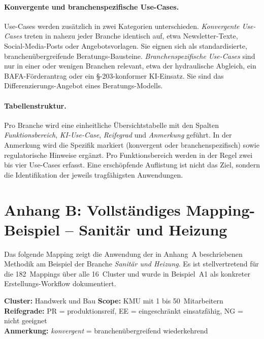 \documentclass[a4paper,11pt]{article}
\begin{document}
\paragraph{Konvergente und branchenspezifische Use-Cases.}
Use-Cases werden zusätzlich in zwei Kategorien unterschieden.
\emph{Konvergente Use-Cases} treten in nahezu jeder Branche identisch
auf, etwa Newsletter-Texte, Social-Media-Posts oder Angebotsvorlagen.
Sie eignen sich als standardisierte, branchen\-übergreifende
Beratungs-Bausteine. \emph{Branchenspezifische Use-Cases} sind nur in
einer oder wenigen Branchen relevant, etwa der hydraulische Abgleich,
ein BAFA-Förder\-antrag oder ein §-203-konformer KI-Einsatz. Sie sind
das Differenzierungs-Angebot eines Beratungs-Modells.

\paragraph{Tabellenstruktur.}
Pro Branche wird eine einheitliche Übersichtstabelle mit den Spalten
\emph{Funktionsbereich}, \emph{KI-Use-Case}, \emph{Reifegrad} und
\emph{Anmerkung} geführt. In der Anmerkung wird die Spezifik markiert
(konvergent oder branchen\-spezifisch) sowie regulatorische Hinweise
ergänzt. Pro Funktionsbereich werden in der Regel zwei bis vier
Use-Cases erfasst. Eine erschöpfende Auflistung ist nicht das Ziel,
sondern die Identifikation der jeweils tragfähigsten Anwendungen.

\newpage

\section*{Anhang B: Vollständiges Mapping-Beispiel -- Sanitär und Heizung}

Das folgende Mapping zeigt die Anwendung der in Anhang~A beschriebenen
Methodik am Beispiel der Branche \emph{Sanitär und Heizung}. Es ist
stellvertretend für die 182~Mappings über alle 16~Cluster und wurde in
Beispiel~A1 als konkreter Erstellungs-Workflow dokumentiert.

\textbf{Cluster:} Handwerk und Bau \quad
\textbf{Scope:} KMU mit 1 bis 50~Mitarbeitern \\
\textbf{Reifegrade:} PR = produktionsreif,
EE = eingeschränkt einsatzfähig,
NG = nicht geeignet \\
\textbf{Anmerkung:} \emph{konvergent} = branchen\-übergreifend
wiederkehrend
\end{document}
